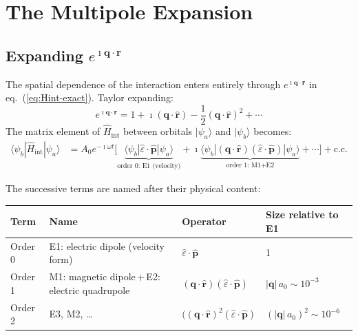 \documentclass[11pt]{article}
\newcommand{\iunit}{\imath}          %
\newcommand{\phat}{\hat{\mathbf{p}}}
\newcommand{\rhat}{\hat{\mathbf{r}}}
\begin{document}
\section{The Multipole Expansion}

\subsection{Expanding $e^{\iunit\mathbf{q}\cdot\mathbf{r}}$}

The spatial dependence of the interaction enters entirely through
$e^{\iunit\mathbf{q}\cdot\mathbf{r}}$ in eq.~(\ref{eq:Hint-exact}).
Taylor expanding:
\begin{equation}
  e^{\iunit\mathbf{q}\cdot\mathbf{r}}
  = 1
  + \iunit(\mathbf{q}\cdot\rhat)
  - \frac{1}{2}(\mathbf{q}\cdot\rhat)^2
  + \cdots
  \label{eq:Taylor}
\end{equation}
The matrix element of $\hat{H}_\mathrm{int}$ between orbitals
$|\psi_a\rangle$ and $|\psi_b\rangle$ becomes:
\begin{align}
  \langle\psi_b|\hat{H}_\mathrm{int}|\psi_a\rangle
  &= A_0 e^{-\iunit\omega t}
  \Big[
    \underbrace{
      \langle\psi_b|\hat{\varepsilon}\cdot\phat|\psi_a\rangle
    }_{\text{order 0: E1 (velocity)}}
    + \iunit
    \underbrace{
      \langle\psi_b|(\mathbf{q}\cdot\rhat)
      (\hat{\varepsilon}\cdot\phat)|\psi_a\rangle
    }_{\text{order 1: M1+E2}}
    + \cdots
  \Big]
  + \text{c.c.}
  \label{eq:multipole-me}
\end{align}

The successive terms are named after their physical content:

\begin{center}
\begin{tabular}{llll}
\hline
Term & Name & Operator & Size relative to E1 \\
\hline
Order 0 & E1: electric dipole (velocity form)
         & $\hat{\varepsilon}\cdot\phat$
         & 1 \\
Order 1 & M1: magnetic dipole\,+\,E2: electric quadrupole
         & $(\mathbf{q}\cdot\rhat)(\hat{\varepsilon}\cdot\phat)$
         & $|\mathbf{q}|\,a_0 \sim 10^{-3}$ \\
Order 2 & E3, M2, \ldots
         & $((\mathbf{q}\cdot\rhat)^2(\hat{\varepsilon}\cdot\phat)$
         & $(|\mathbf{q}|\,a_0)^2 \sim 10^{-6}$ \\
\hline
\end{tabular}
\end{center}
\end{document}
